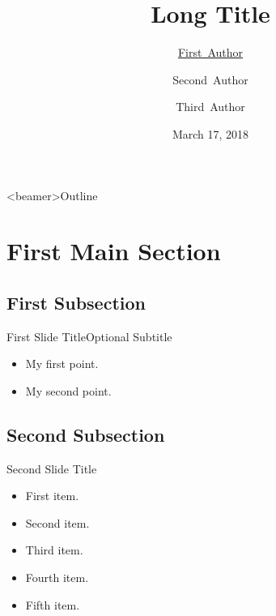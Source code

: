 \documentclass{beamer}
\title[Short Title]
{Long Title}
\author[F. Author]
{\texorpdfstring{\underline{First~Author}}{First~Author}\inst{\dag} \and Second~Author\inst{\dag} \and Third~Author\inst{\ddag}}
\institute[NIU]%
{
 \inst{\dag}%
   Northern Illinois University, USA
   \and
   \inst{\ddag}%
   Lorem Ipsum
}
\date{March 17, 2018}
\begin{document}
\frame{\titlepage}




\begin{frame}<beamer>{Outline}
    \tableofcontents
\end{frame}

\section{First Main Section}

\subsection{First Subsection}

\begin{frame}{First Slide Title}{Optional Subtitle}
  \begin{itemize}
  \item {
    My first point.
  }
  \item {
    My second point.
  }
  \end{itemize}
\end{frame}

\subsection{Second Subsection}

\begin{frame}{Second Slide Title}
  \begin{itemize}
  \item {
    First item.
    \pause %
  }
  \item {   
    Second item.
  }
  \item<3-> {
    Third item.
  }
  \item<4-> {
    Fourth item.
  }
  \item<5-> {
    Fifth item. 
  }
  \end{itemize}
\end{frame}
\end{document}
